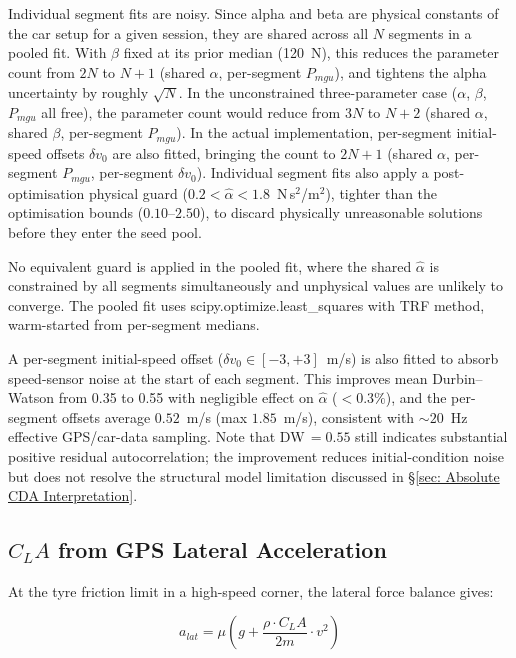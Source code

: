 Individual segment fits are noisy. Since alpha and beta are physical constants of the car setup for a given session, they are shared across all $N$ segments in a pooled fit. With $\beta$ fixed at its prior median (120~N), this reduces the parameter count from $2N$ to $N+1$ (shared $\alpha$, per-segment $P_{mgu}$), and tightens the alpha uncertainty by roughly $\sqrt{N}$. In the unconstrained three-parameter case ($\alpha$, $\beta$, $P_{mgu}$ all free), the parameter count would reduce from $3N$ to $N+2$ (shared $\alpha$, shared $\beta$, per-segment $P_{mgu}$). In the actual implementation, per-segment initial-speed offsets $\delta v_0$ are also fitted, bringing the count to $2N+1$ (shared $\alpha$, per-segment $P_{mgu}$, per-segment $\delta v_0$). Individual segment fits also apply a post-optimisation physical guard ($0.2 < \hat\alpha < 1.8$~N\,s$^2$/m$^2$), tighter than the optimisation bounds ($0.10$--$2.50$), to discard physically unreasonable solutions before they enter the seed pool.

No equivalent guard is applied in the pooled fit, where the shared $\hat\alpha$ is constrained by all segments simultaneously and unphysical values are unlikely to converge. The pooled fit uses scipy.\allowbreak optimize.\allowbreak least\_squares\cite{SciPy_Algorithms} with TRF method, warm-started from per-segment medians. 

A per-segment initial-speed offset ($\delta v_0 \in [-3, +3]$~m/s) is also fitted to absorb speed-sensor noise at the start of each segment. This improves mean Durbin--Watson from 0.35 to 0.55 with negligible effect on $\hat{\alpha}$ ($<0.3\%$), and the per-segment offsets average $0.52$~m/s (max $1.85$~m/s), consistent with $\sim\!20$~Hz effective GPS/car-data sampling. Note that DW$\,=0.55$ still indicates substantial positive residual autocorrelation; the improvement reduces initial-condition noise but does not resolve the structural model limitation discussed in \S\ref{sec: Absolute CDA Interpretation}.

\subsection[CLA from GPS Lateral Acceleration]{$C_LA$ from GPS Lateral Acceleration}
\label{sec: ClLA from GPS Lateral Acceleration}

At the tyre friction limit in a high-speed corner, the lateral force balance gives:

\begin{equation}
    a_{lat} = \mu \left(g+ \frac{\rho\cdot C_LA}{2m}\cdot v^2\right)
\end{equation}

